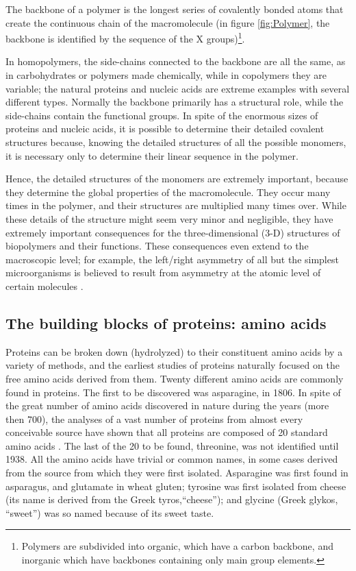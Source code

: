 The backbone of a polymer is the longest series of covalently bonded atoms that create the continuous chain of the macromolecule (in figure \ref{fig:Polymer}, the backbone is identified by the sequence of the X groups)\footnote{Polymers are subdivided into organic, which have a carbon backbone, and inorganic which have backbones containing only main group elements.}. %

In homopolymers, the side-chains connected to the backbone are all the same, as in carbohydrates or polymers made chemically, while in copolymers they are variable; the natural proteins and nucleic acids are extreme examples with several different types. Normally the backbone primarily has a structural role, while the side-chains contain the functional groups. In spite of the enormous sizes of proteins and nucleic acids, it is possible to determine their detailed covalent structures because, knowing the detailed structures of all the possible monomers, it is necessary only to determine their linear sequence in the polymer.

Hence, the detailed structures of the monomers are extremely important, because they determine the global properties of the macromolecule. They occur many times in the polymer, and their structures are multiplied many times over. While these details of the structure might seem very minor and negligible, they have extremely important consequences for the three-dimensional (3-D) structures of biopolymers and their functions. These consequences even extend to the macroscopic level; for example, the left/right asymmetry of all but the simplest microorganisms is believed to result from asymmetry at the atomic level of certain molecules
\cite{creighton2010biophysical}.


\subsection{The building blocks of proteins: amino acids}\label{ssec:amino-acids}

Proteins can be broken down (hydrolyzed) to their constituent amino acids by a variety of methods, and the earliest studies of proteins naturally focused on the free amino acids derived from them. Twenty different amino acids are commonly found in proteins. The first to be discovered was asparagine, in 1806. 
In spite of the great number of amino acids discovered in nature during the years (more then 700), the analyses of a vast number of proteins from almost every conceivable source have shown that all proteins are composed of 20 standard amino acids
\cite{wu2013amino}. 
The last of the 20 to be found, threonine, was not identified until 1938. All the amino acids have trivial or common names, in some cases derived from the source from which they were first isolated. Asparagine was first found in asparagus, and glutamate in wheat gluten; tyrosine was first isolated from cheese (its name is derived from the Greek tyros,``cheese''); and glycine (Greek glykos, ``sweet'') was so named because of its sweet taste.
\cite{nelson2008lehninger}

